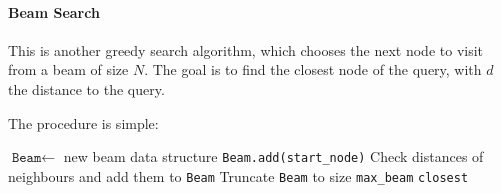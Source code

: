 \paragraph{Beam Search}
This is another greedy search algorithm, which chooses the next node to visit from a beam of size $N$.
The goal is to find the closest node of the query, with $d$ the distance to the query.

The procedure is simple:
\begin{algorithm}
    \caption{Beam Search}
    \begin{algorithmic}[1]
            \State $\texttt{Beam} \gets$ new beam data structure
            \State \texttt{Beam.add(start\_node)}
                \State Check distances of neighbours and add them to \texttt{Beam}
                \State Truncate \texttt{Beam} to size \texttt{max\_beam} 
            \EndWhile
            \State \Return \texttt{closest}
        \EndProcedure
    \end{algorithmic}
\end{algorithm}

